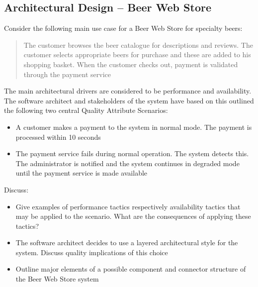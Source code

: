 \subsection{Architectural Design -- Beer Web Store}
Consider the following main use case for a Beer Web Store for specialty
beers:
\begin{quote}
  The customer browses the beer catalogue for descriptions and
  reviews. The customer selects appropriate beers for purchase and
  these are added to his shopping basket. When the customer checks
  out, payment is validated through the payment service
\end{quote}
The main architectural drivers are considered to be performance and
availability. The software architect and stakeholders of the system
have based on this outlined the following two central Quality
Attribute Scenarios:
\begin{itemize}
  \item A customer makes a payment to the system in normal mode. The
  payment is processed within 10 seconds
  \item The payment service fails during normal operation. The system
  detects this. The administrator is notified and the system continues
  in degraded mode until the payment service is made available
\end{itemize}

Discuss:
\begin{itemize}
\item Give examples of performance tactics respectively availability
tactics that may be applied to the scenario. What are the consequences
of applying these tactics?
\item The software architect decides to use a layered architectural
style for the system. Discuss quality implications of this choice
\item Outline major elements of a possible component and connector
structure of the Beer Web Store system
\end{itemize}
